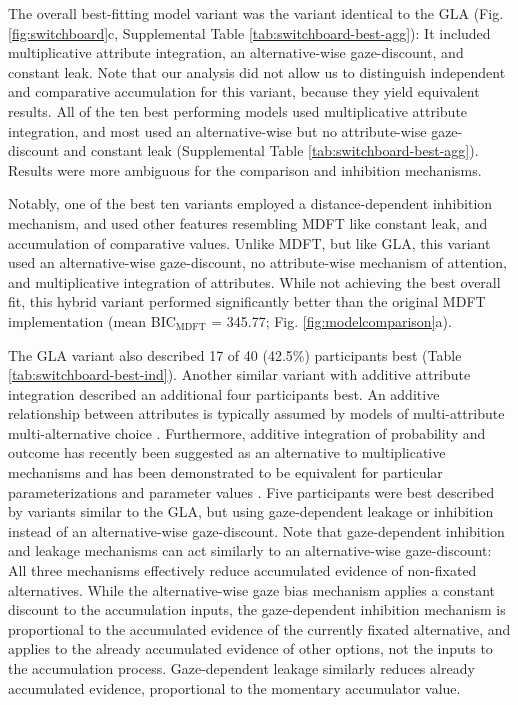 \documentclass[11pt, a4paper]{article}
\begin{document}
The overall best-fitting model variant was the variant identical to the GLA (Fig. \ref{fig:switchboard}c, Supplemental Table \ref{tab:switchboard-best-agg}): It included multiplicative attribute integration, an alternative-wise gaze-discount, and constant leak. Note that our analysis did not allow us to distinguish independent and comparative accumulation for this variant, because they yield equivalent results. All of the ten best performing models used multiplicative attribute integration, and most used an alternative-wise but no attribute-wise gaze-discount and constant leak (Supplemental Table \ref{tab:switchboard-best-agg}). Results were more ambiguous for the comparison and inhibition mechanisms.

Notably, one of the best ten variants employed a distance-dependent inhibition mechanism, and used other features resembling MDFT like constant leak, and accumulation of comparative values. Unlike MDFT, but like GLA, this variant used an alternative-wise gaze-discount, no attribute-wise mechanism of attention, and multiplicative integration of attributes. While not achieving the best overall fit, this hybrid variant performed significantly better than the original MDFT implementation (mean BIC$_{\text{MDFT}}$ = 345.77; Fig. \ref{fig:modelcomparison}a).

The GLA variant also described 17 of 40 (42.5\%) participants best (Table \ref{tab:switchboard-best-ind}). Another similar variant with additive attribute integration described an additional four participants best. An additive relationship between attributes is typically assumed by models of multi-attribute multi-alternative choice \parencite[e.g.,][]{roe2001MultialternativeDecisionField,usher2004LossAversionInhibition}. Furthermore, additive integration of probability and outcome has recently been suggested as an alternative to multiplicative mechanisms and has been demonstrated to be equivalent for particular parameterizations and parameter values \parencite{rouault2019PrefrontalMechanismsCombining}. Five participants were best described by variants similar to the GLA, but using gaze-dependent leakage or inhibition instead of an alternative-wise gaze-discount. Note that gaze-dependent inhibition and leakage mechanisms can act similarly to an alternative-wise gaze-discount: All three mechanisms effectively reduce accumulated evidence of non-fixated alternatives. While the alternative-wise gaze bias mechanism applies a constant discount to the accumulation inputs, the gaze-dependent inhibition mechanism is proportional to the accumulated evidence of the currently fixated alternative, and applies to the already accumulated evidence of other options, not the inputs to the accumulation process. Gaze-dependent leakage similarly reduces already accumulated evidence, proportional to the momentary accumulator value.
\end{document}
